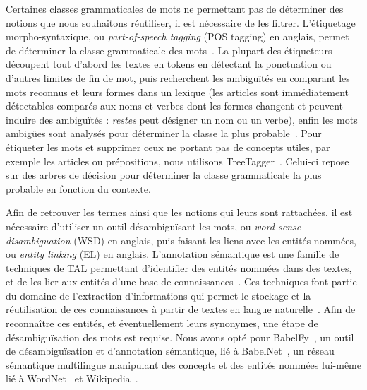 Certaines classes grammaticales de mots ne permettant pas de déterminer des notions que nous souhaitons réutiliser, il est nécessaire de les filtrer.
L'étiquetage morpho-syntaxique, ou \textit{part-of-speech tagging} (POS tagging) en anglais, permet de déterminer la classe grammaticale des mots~\cite{voutilainen2003part}\cite{agirre2007word}.
La plupart des étiqueteurs découpent tout d'abord les textes en tokens en détectant la ponctuation ou d'autres limites de fin de mot, puis recherchent les ambiguïtés en comparant les mots reconnus et leurs formes dans un lexique (les articles sont immédiatement détectables comparés aux noms et verbes dont les formes changent et peuvent induire des ambiguïtés : \textit{restes} peut désigner un nom ou un verbe), enfin les mots ambigües sont analysés pour déterminer la classe la plus probable~\cite{voutilainen2003part}.
Pour étiqueter les mots et supprimer ceux ne portant pas de concepts utiles, par exemple les articles ou prépositions, nous utilisons TreeTagger~\cite{schmid1994probabilistic}\cite{Schmid95improvementsin}.
Celui-ci repose sur des arbres de décision pour déterminer la classe grammaticale la plus probable en fonction du contexte.

\bigskip

Afin de retrouver les termes ainsi que les notions qui leurs sont rattachées, il est nécessaire d'utiliser un outil désambiguïsant les mots, ou \textit{word sense disambiguation} (WSD) en anglais, puis faisant les liens avec les entités nommées, ou \textit{entity linking} (EL) en anglais.
L'annotation sémantique est une famille de techniques de TAL permettant d'identifier des entités nommées dans des textes, et de les lier aux entités d'une base de connaissances~\cite{rao2013entity}.
Ces techniques font partie du domaine de l'extraction d'informations qui permet le stockage et la réutilisation de ces connaissances à partir de textes en langue naturelle~\cite{rao2013entity}.
Afin de reconnaître ces entités, et éventuellement leurs synonymes, une étape de désambiguïsation des mots est requise.
Nous avons opté pour BabelFy~\cite{moro2014entity}\cite{moro2014multilingual}, un outil de désambiguïsation et d'annotation sémantique, lié à BabelNet~\cite{navigli2012babelnet}, un réseau sémantique multilingue manipulant des concepts et des entités nommées lui-même lié à WordNet~\cite{miller1995wordnet} et Wikipedia~\cite{volkel2006semantic}\cite{merzeau2015wikipedia}.

\bigskip

